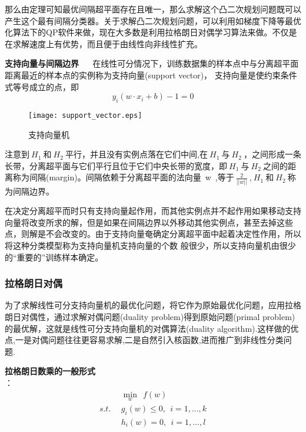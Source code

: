 那么由定理可知最优间隔超平面存在且唯一，那么求解这个凸二次规划问题既可以产生这个最有间隔分类器。关于求解凸二次规划问题，可以利用如梯度下降等最优化算法下的QP软件来做，现在大多数是利用拉格朗日对偶学习算法来做。不仅是在求解速度上有优势，而且便于由线性向非线性扩充。

\textbf{支持向量与间隔边界} ~~ 在线性可分情况下，训练数据集的样本点中与分离超平面距离最近的样本点的实例称为支持向量(support vector)， 支持向量是使约束条件式等号成立的点，即
$$y_i(w\cdot x_i+b)-1=0$$

\begin{figure}[!htb]
  \centering
  \texttt{[image: support\_vector.eps]}
  \caption{支持向量机}
\end{figure}

注意到$~H_1~$和$~H_2~$平行，并且没有实例点落在它们中间,在$~H_1~$与$~H_2~$，之间形成一条长带，分离超平面与它们平行且位于它们中央长带的宽度，即$~H_1~$与$~H_2~$之间的距离称为间隔(margin)。间隔依赖于分离超平面的法向量~w~,等于$~\frac{2}{||w||}~$,$~H_1~$和$~H_2~$称为间隔边界。

在决定分离超平而时只有支持向量起作用，而其他实例点并不起作用如果移动支持向量将改变所求的解，但是如果在间隔边界以外移动其他实例点，甚至去掉这些点，则解是不会改变的。由于支持向量奄确定分离超平面中起着决定性作用，所以将这种分类模型称为支持向量机支持向量的个数 般很少，所以支持向量机由很少的“重要的”训练样本确定。

\subsubsection{拉格朗日对偶}
为了求解线性可分支持向量机的最优化问题，将它作为原始最优化问题，应用拉格朗日对偶性，通过求解对偶问题(duality problem)得到原始问题(primal problem)的最优解，这就是线性可分支持向量机的对偶算法(duality algorithm).这样做的优点,一是对偶问题往往更容易求解,二是自然引入核函数,进而推广到非线性分类问题.

\textbf{拉格朗日数乘的一般形式}
\\ ：
\begin{align}
            &\min \limits_w ~~f(w)   \nonumber \\
    s.t.~~  &g_i(w)\leq0,~~i=1,...,k\nonumber\\
            &h_i(w) = 0,~~i=1,...,l\nonumber
\end{align}

